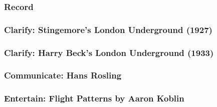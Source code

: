\documentclass[12pt]{beamer}\usepackage[]{graphicx}\usepackage[]{color}
\begin{document}

\begin{frame}
\frametitle{Record}
\begin{center}

\small{ }
\end{center}
\end{frame}


\begin{frame}
\frametitle{Clarify: Stingemore's London Underground (1927)}
\begin{center}
\end{center}
\end{frame}


\begin{frame}
\frametitle{Clarify: Harry Beck's London Underground (1933)}
\begin{center}
\end{center}
\end{frame}


\begin{frame}
\frametitle{Communicate: Hans Rosling}
\begin{center}
\end{center}
\end{frame}


\begin{frame}
\frametitle{Entertain: Flight Patterns by Aaron Koblin}
\begin{center}
\end{center}
\end{frame}

\end{document}
